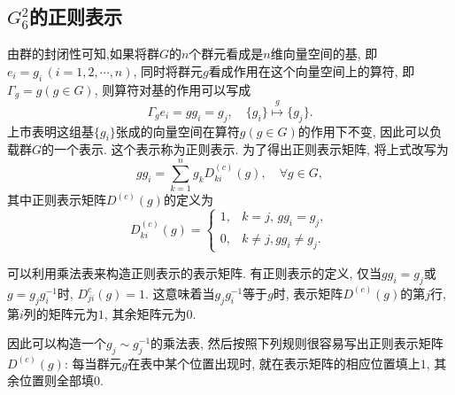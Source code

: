\documentclass[UTF8]{ctexart}
\begin{document}
\subsection{$G_6^2$的正则表示}
由群的封闭性可知,如果将群$G$的$n$个群元看成是$n$维向量空间的基, 即$e_i = g_i \, (i = 1, 2, \cdots, n)$, 同时将群元$g$看成作用在这个向量空间上的算符, 即$\varGamma_g = g (g \in G)$, 则算符对基的作用可以写成
\begin{equation}
  \varGamma_g e_i = g g_i = g_j, \quad \{g_i\} \stackrel{g}{\mapsto} \{g_j\}.
\end{equation}
上市表明这组基$\{g_i\}$张成的向量空间在算符$g(g \in G)$的作用下不变, 因此可以负载群$G$的一个表示. 这个表示称为正则表示. 为了得出正则表示矩阵, 将上式改写为
\begin{equation}
  gg_i = \sum_{k = 1}^{n} g_k D_{ki}^{(c)} (g), \quad \forall g \in G, 
\end{equation}
其中正则表示矩阵$D^{(c)}(g)$的定义为
\begin{equation}
  D_{ki}^{(c)} (g) =
  \begin{cases}
    1, & k = j, \, gg_i = g_j,\\
    0, & k \neq j, gg_i \neq g_j.
  \end{cases}
\end{equation}

可以利用乘法表来构造正则表示的表示矩阵. 有正则表示的定义, 仅当$gg_i = g_j$或$g = g_j g_i^{-1}$时, $D_{ji}^{c} (g) = 1$. 这意味着当$g_j g_i^{-1}$等于$g$时, 表示矩阵$D^{(c)}(g)$的第$j$行, 第$i$列的矩阵元为$1$, 其余矩阵元为$0$.

因此可以构造一个$g_j \sim g_j^{-1}$的乘法表, 然后按照下列规则很容易写出正则表示矩阵$D^{(c)}(g)$: 每当群元$g$在表中某个位置出现时, 就在表示矩阵的相应位置填上$1$, 其余位置则全部填$0$.
\end{document}
